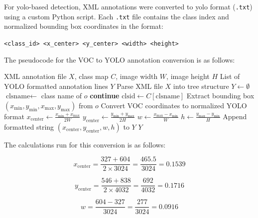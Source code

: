 For \gls{yolo}-based detection, XML annotations were converted to \gls{yolo} format (\texttt{.txt}) using a custom Python script. Each \texttt{.txt} file contains the class index and normalized bounding box coordinates in the format:

\begin{center}
\texttt{<class\_id> <x\_center> <y\_center> <width> <height>}
\end{center}

The pseudocode for the VOC to YOLO annotation conversion is as follows:

\begin{algorithm}
\caption{VOC to YOLO Annotation Conversion}
\label{algo:voc-to-yolo}
\begin{algorithmic}
\Require XML annotation file $X$, class map $C$, image width $W$, image height $H$
\Ensure List of YOLO formatted annotation lines $Y$
\State Parse XML file $X$ into tree structure
\State $Y \leftarrow \emptyset$
    \State $\text{clsname} \leftarrow$ class name of $o$
        \State \textbf{continue}
    \EndIf
    \State $\text{clsid} \leftarrow C[\text{clsname}]$
    \State Extract bounding box $(x_{\min}, y_{\min}, x_{\max}, y_{\max})$ from $o$
    \State Convert VOC coordinates to normalized YOLO format
    \State $x_{\text{center}} \leftarrow \frac{x_{\min} + x_{\max}}{2W}$
    \State $y_{\text{center}} \leftarrow \frac{y_{\min} + y_{\max}}{2H}$
    \State $w \leftarrow \frac{x_{\max} - x_{\min}}{W}$
    \State $h \leftarrow \frac{y_{\max} - y_{\min}}{H}$
    \State Append formatted string $(x_{\text{center}}, y_{\text{center}}, w, h)$ to $Y$
\EndFor
\State \Return $Y$
\end{algorithmic}
\end{algorithm}

The calculations run for this conversion is as follows:

\begin{equation}
x_{\text{center}} = \frac{327 + 604}{2 \times 3024} = \frac{465.5}{3024} = 0.1539
\label{eq:voc-yolo-x}
\end{equation}

\begin{equation}
y_{\text{center}} = \frac{546 + 838}{2 \times 4032} = \frac{692}{4032} = 0.1716
\label{eq:voc-yolo-y}
\end{equation}

\begin{equation}
w = \frac{604 - 327}{3024} = \frac{277}{3024} = 0.0916
\label{eq:voc-yolo-w}
\end{equation}

